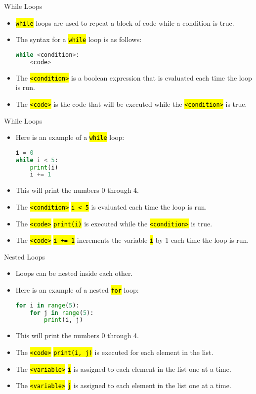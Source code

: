 \documentclass[
    aspectratio=169, 
    usepdftitle=false, 
    xcolor={dvipsnames},
    hyperref={
        colorlinks,
        linkcolor=black,
        urlcolor=blue}
    ]{beamer}
\let\OldTexttt\texttt
\renewcommand{\texttt}[1]{\OldTexttt{\hl{#1}}}%
\begin{document}
\begin{frame}[fragile]{While Loops}
    \begin{itemize}
        \item \texttt{while} loops are used to repeat a block of code while a condition is true.
        \item The syntax for a \texttt{while} loop is as follows:
        \begin{lstlisting}[language=Python]
while <condition>:
    <code>
        \end{lstlisting}
        \item The \texttt{<condition>} is a boolean expression that is evaluated each time the loop is run.
        \item The \texttt{<code>} is the code that will be executed while the \texttt{<condition>} is true.
    \end{itemize}
\end{frame}

\begin{frame}[fragile]{While Loops}
    \begin{itemize}
        \item Here is an example of a \texttt{while} loop:
        \begin{lstlisting}[language=Python]
i = 0
while i < 5:
    print(i)
    i += 1
        \end{lstlisting}
        \item This will print the numbers 0 through 4.
        \item The \texttt{<condition>} \texttt{i < 5} is evaluated each time the loop is run.
        \item The \texttt{<code>} \texttt{print(i)} is executed while the \texttt{<condition>} is true.
        \item The \texttt{<code>} \texttt{i += 1} increments the variable \texttt{i} by 1 each time the loop is run.
    \end{itemize}
\end{frame}

\begin{frame}[fragile]{Nested Loops}
    \begin{itemize}
        \item Loops can be nested inside each other.
        \item Here is an example of a nested \texttt{for} loop:
        \begin{lstlisting}[language=Python]
for i in range(5):
    for j in range(5):
        print(i, j)
        \end{lstlisting}
        \item This will print the numbers 0 through 4.
        \item The \texttt{<code>} \texttt{print(i, j)} is executed for each element in the list.
        \item The \texttt{<variable>} \texttt{i} is assigned to each element in the list one at a time.
        \item The \texttt{<variable>} \texttt{j} is assigned to each element in the list one at a time.
    \end{itemize}
\end{frame}
\end{document}
